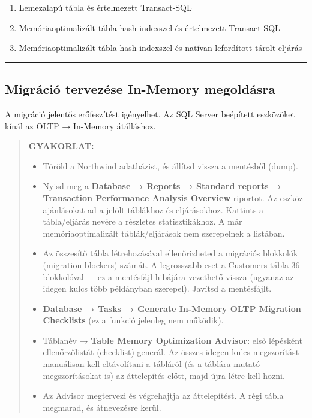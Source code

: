\documentclass[
  magyar,
]{article}
\providecommand{\tightlist}{%
  \setlength{\itemsep}{0pt}\setlength{\parskip}{0pt}}
\begin{document}
\begin{enumerate}
\def\labelenumi{\arabic{enumi}.}
\tightlist
\item
  Lemezalapú tábla és értelmezett Transact-SQL
\item
  Memóriaoptimalizált tábla hash indexszel és értelmezett Transact-SQL
\item
  Memóriaoptimalizált tábla hash indexszel és natívan lefordított tárolt
  eljárás
\end{enumerate}

\begin{center}\rule{0.5\linewidth}{0.5pt}\end{center}

\subsection{Migráció tervezése In-Memory
megoldásra}\label{migruxe1ciuxf3-tervezuxe9se-in-memory-megolduxe1sra}

A migráció jelentős erőfeszítést igényelhet. Az SQL Server beépített
eszközöket kínál az OLTP → In-Memory átálláshoz.

\begin{quote}
\textbf{GYAKORLAT:}

\begin{itemize}
\tightlist
\item
  Töröld a Northwind adatbázist, és állítsd vissza a mentésből (dump).
\item
  Nyisd meg a \textbf{Database → Reports → Standard reports →
  Transaction Performance Analysis Overview} riportot. Az eszköz
  ajánlásokat ad a jelölt táblákhoz és eljárásokhoz. Kattints a
  tábla/eljárás nevére a részletes statisztikákhoz. A már
  memóriaoptimalizált táblák/eljárások nem szerepelnek a listában.
\item
  Az összesítő tábla létrehozásával ellenőrizheted a migrációs blokkolók
  (migration blockers) számát. A legrosszabb eset a Customers tábla 36
  blokkolóval --- ez a mentésfájl hibájára vezethető vissza (ugyanaz az
  idegen kulcs több példányban szerepel). Javítsd a mentésfájlt.
\item
  \textbf{Database → Tasks → Generate In-Memory OLTP Migration
  Checklists} (ez a funkció jelenleg nem működik).
\item
  Táblanév → \textbf{Table Memory Optimization Advisor}: első lépésként
  ellenőrzőlistát (checklist) generál. Az összes idegen kulcs
  megszorítást manuálisan kell eltávolítani a tábláról (és a táblára
  mutató megszorításokat is) az áttelepítés előtt, majd újra létre kell
  hozni.
\item
  Az Advisor megtervezi és végrehajtja az áttelepítést. A régi tábla
  megmarad, és átnevezésre kerül.
\end{itemize}
\end{quote}
\end{document}
